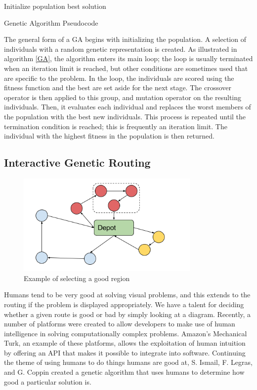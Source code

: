 \documentclass{sig-alternate}
\begin{document}
\begin{algorithm}[t]
Initialize population\;
\Return best solution\;
\caption{Genetic Algorithm Pseudocode\label{GA}}
\end{algorithm}

The general form of a GA begins with initializing the population. A selection of individuals with a random genetic representation is created. As illustrated in algorithm \ref{GA}, the algorithm enters its main loop; the loop is usually terminated when an iteration limit is reached, but other conditions are sometimes used that are specific to the problem. In the loop, the individuals are scored using the fitness function and the best are set aside for the next stage. The crossover operator is then applied to this group, and mutation operator on the resulting individuals. Then, it evaluates each individual and replaces the worst members of the population with the best new individuals. This process is repeated until the termination condition is reached; this is frequently an iteration limit. The individual with the highest fitness in the population is then returned.
\subsection{Interactive Genetic Routing}

\begin{figure}[t]
\centering
\includegraphics[width=3.5in, keepaspectratio]{TAG.png}
\caption{Example of selecting a good region}
\label{fig:Humangraph}
\end{figure}

Humans tend to be very good at solving visual problems, and this extends to the routing if the problem is displayed appropriately. We have a talent for deciding whether a given route is good or bad by simply looking at a diagram. Recently, a number of platforms were created to allow developers to make use of human intelligence in solving computationally complex problems. Amazon's Mechanical Turk, an example of these platforms, allows the exploitation of human intuition by offering an API that makes it possible to integrate into software. 
	Continuing the theme of using humans to do things humans are good at, S. Ismail, F. Legras, and G. Coppin \cite{Ismail:2012} created a genetic algorithm that uses humans to determine how good a particular solution is. 
\end{document}
